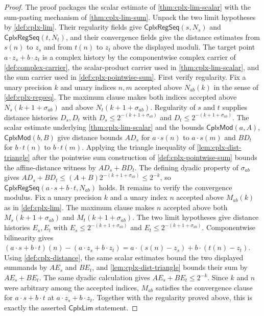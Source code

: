 \begin{proof}
The proof packages the scalar estimate of \autoref{thm:cplx-lim-scalar} with the sum-pasting mechanism of \autoref{thm:cplx-lim-sum}. Unpack the two limit hypotheses by \autoref{def:cplx-lim}. Their regularity fields give $\mathsf{CplxRegSeq}(s,N_s)$ and $\mathsf{CplxRegSeq}(t,N_t)$, and their convergence fields give the distance estimates from $s(n)$ to $z_s$ and from $t(n)$ to $z_t$ above the displayed moduli. The target point $a\cdot z_s+b\cdot z_t$ is a complex history by the componentwise complex carrier of \autoref{def:complex-carrier}, the scalar-product carrier used in \autoref{thm:cplx-lim-scalar}, and the sum carrier used in \autoref{def:cplx-pointwise-sum}.
First verify regularity. Fix a unary precision $k$ and unary indices $n,m$ accepted above $N_{ab}(k)$ in the sense of \autoref{def:cplx-regseq}. The maximum clause makes both indices accepted above $N_s(k+1+\sigma_{ab})$ and above $N_t(k+1+\sigma_{ab})$. Regularity of $s$ and $t$ supplies distance histories $D_s,D_t$ with $D_s\leq 2^{-(k+1+\sigma_{ab})}$ and $D_t\leq 2^{-(k+1+\sigma_{ab})}$. The scalar estimate underlying \autoref{thm:cplx-lim-scalar} and the bounds $\mathsf{CplxMod}(a,A)$, $\mathsf{CplxMod}(b,B)$ give distance bounds $A D_s$ for $a\cdot s(n)$ to $a\cdot s(m)$ and $B D_t$ for $b\cdot t(n)$ to $b\cdot t(m)$. Applying the triangle inequality of \autoref{lem:cplx-dist-triangle} after the pointwise sum construction of \autoref{def:cplx-pointwise-sum} bounds the affine-distance witness by $A D_s+B D_t$. The defining dyadic property of $\sigma_{ab}$ gives $A D_s+B D_t\leq (A+B)2^{-(k+1+\sigma_{ab})}\leq 2^{-k}$, so $\mathsf{CplxRegSeq}(a\cdot s+b\cdot t,N_{ab})$ holds.
It remains to verify the convergence modulus. Fix a unary precision $k$ and a unary index $n$ accepted above $M_{ab}(k)$ as in \autoref{def:cplx-lim}. The maximum clause makes $n$ accepted above both $M_s(k+1+\sigma_{ab})$ and $M_t(k+1+\sigma_{ab})$. The two limit hypotheses give distance histories $E_s,E_t$ with $E_s\leq 2^{-(k+1+\sigma_{ab})}$ and $E_t\leq 2^{-(k+1+\sigma_{ab})}$. Componentwise bilinearity gives $(a\cdot s+b\cdot t)(n)-(a\cdot z_s+b\cdot z_t)=a\cdot(s(n)-z_s)+b\cdot(t(n)-z_t)$. Using \autoref{def:cplx-distance}, the same scalar estimates bound the two displayed summands by $A E_s$ and $B E_t$, and \autoref{lem:cplx-dist-triangle} bounds their sum by $A E_s+B E_t$. The same dyadic calculation gives $A E_s+B E_t\leq 2^{-k}$. Since $k$ and $n$ were arbitrary among the accepted indices, $M_{ab}$ satisfies the convergence clause for $a\cdot s+b\cdot t$ at $a\cdot z_s+b\cdot z_t$. Together with the regularity proved above, this is exactly the asserted $\mathsf{CplxLim}$ statement.
\end{proof}
